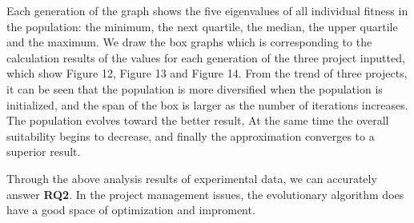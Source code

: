 Each generation of the graph shows the five eigenvalues of all individual 
fitness in the population: the minimum, the next quartile, the median, the 
upper quartile and the maximum. We draw the box graphs which is corresponding 
to the calculation results of the values for each generation of the three 
project inputted, which show Figure 12, Figure 13 and Figure 14. From the 
trend of three projects, it can be seen that the population is more 
diversified when the population is initialized, and the span of the box is 
larger as the number of iterations increases. The population evolves toward 
the better result, At the same time the overall suitability begins to 
decrease, and finally the approximation converges to a superior result.


Through the above analysis results of experimental data, we can accurately 
answer \textbf{RQ2}. In the project management issues, the evolutionary algorithm does 
have a good space of optimization and improment.





